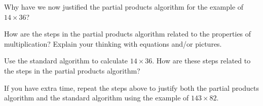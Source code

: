 \documentclass[nooutcomes,noauthor,handout]{ximera}
\begin{document}
\begin{problem}
Why have we now justified the partial products algorithm for the example of $14 \times 36$?
\end{problem}


\begin{problem}
How are the steps in the partial products algorithm related to the properties of multiplication? Explain your thinking with equations and/or pictures.
\end{problem}



\begin{problem}
Use the standard algorithm to calculate $14 \times 36$. How are these steps related to the steps in the partial products algorithm?
\end{problem}



\begin{problem}
If you have extra time, repeat the steps above to justify both the partial products algorithm and the standard algorithm using the example of $143 \times 82$.
\end{problem}



\newpage
\end{document}
